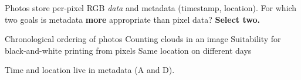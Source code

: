 \question[5]
Photos store per-pixel RGB \emph{data} and metadata (timestamp, location). For which two goals is metadata \textbf{more} appropriate than pixel data? \textbf{Select two.}
\begin{checkboxes}
  \CorrectChoice Chronological ordering of photos
  \choice Counting clouds in an image
  \choice Suitability for black-and-white printing from pixels
  \CorrectChoice Same location on different days
\end{checkboxes}
\begin{solution}
  Time and location live in metadata (A and D).
\end{solution}

